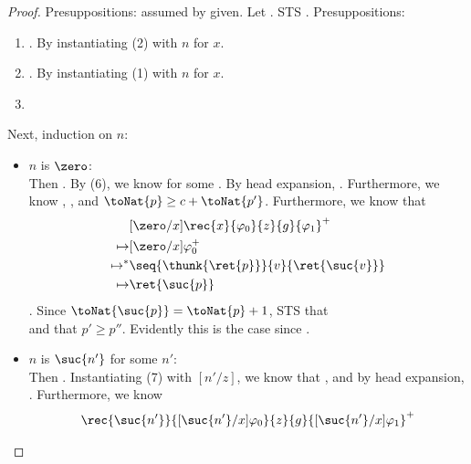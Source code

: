 \begin{proof}
Presuppositions: assumed by given. Let . STS 
. Presuppositions: 
\begin{enumerate}
    \item {}. By instantiating (2) with $n$ for $x$. 
    \item {}. By instantiating (1) with $n$ for $x$. 
    \item {}
\end{enumerate}
Next, induction on $n$: 
\begin{itemize}
    \item $n$ is $\zero$:\\
    Then . By (6), we know  for some .
    By head expansion, . 
    Furthermore, we know , , and $\toNat{p} \ge c + \toNat{p'}$. Furthermore, we know that 
    \begin{align*}
        &[\zero/x]\rec{x}{\varphi_0}{z}{g}{\varphi_1}^+\\ 
        \mapsto & [\zero/x]\varphi_0^+\\
        \mapsto^* &\seq{\thunk{\ret{p}}}{v}{\ret{\suc{v}}}\\
        \mapsto& \ret{\suc{p}}\\
    \end{align*}. Since $\toNat{\suc{p}} = \toNat{p} + 1$, STS that\\
    and that $p' \ge p''$. Evidently this is the case since
    .
    \item $n$ is $\suc{n'}$ for some $n'$:\\
    Then . 
    Instantiating (7) with $[n'/z]$, we know that , 
    and by head expansion, . Furthermore, we know
    \begin{align*}
        &\rec{\suc{n'}}{[\suc{n'}/x]\varphi_0}{z}{g}{[\suc{n'}/x]\varphi_1}^+\\

\end{align*}
\end{itemize}
\end{proof}

